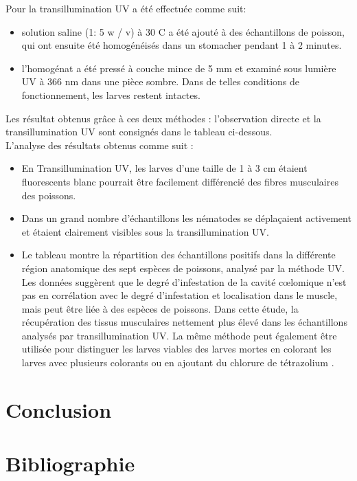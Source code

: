 \documentclass[12pt,a4paper]{article}
\begin{document}
Pour la transillumination UV a été effectuée comme suit: 
\begin{itemize}
\item   solution saline (1: 5 w / v) à 30 \degree C a été ajouté à des échantillons de poisson, qui ont ensuite été homogénéisés dans un stomacher pendant 1 à 2 minutes.
\item l'homogénat a été pressé à couche mince de 5 mm et examiné sous lumière UV à 366 nm dans une pièce sombre. Dans de telles conditions de fonctionnement, les larves restent intactes.
\end{itemize} 
Les résultat obtenus grâce à ces deux méthodes : l’observation directe et la transillumination UV sont consignés dans le tableau ci-dessous.\\  
L'analyse des résultats obtenus comme suit :
\begin{itemize}
\item En Transillumination UV, les larves d'une taille de 1 à 3 cm étaient fluorescents blanc pourrait être facilement différencié des fibres musculaires des poissons.
\item  	Dans un grand nombre d'échantillons les nématodes se déplaçaient activement et étaient clairement visibles sous la transillumination UV.
 \item	Le tableau montre la répartition des échantillons positifs dans la différente région anatomique des sept espèces de poissons, analysé par la méthode UV. Les données suggèrent que le degré d'infestation de la cavité cœlomique n'est pas en corrélation avec le degré d'infestation et localisation dans le muscle, mais peut être liée à des espèces de poissons. Dans cette étude, la récupération des tissus musculaires nettement plus élevé dans les échantillons analysés par transillumination UV. La même méthode peut également être utilisée pour distinguer les larves viables des larves mortes en colorant les larves avec plusieurs colorants ou en ajoutant du chlorure de tétrazolium . 
\end{itemize} 
\newpage


\section*{Conclusion}
\newpage
\section*{Bibliographie}
\end{document}
